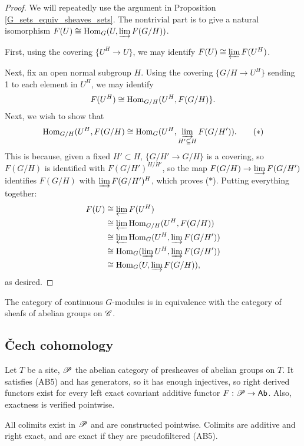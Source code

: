 \documentclass[11pt]{amsart}
\begin{document}
\begin{proof}
We will repeatedly use the argument in Proposition \ref{G_sets_equiv_sheaves_sets}. The nontrivial part is to give a natural isomorphism $F(U)\cong \operatorname{Hom}_G(U, \varinjlim F(G/H))$.

First, using the covering $\{U^H \to U\}$, we may identify $F(U)\cong \varprojlim F(U^H)$.

Next, fix an open normal subgroup $H$. Using the covering $\{G/H\to U^H\}$ sending 1 to each element in $U^H$, we may identify
\[F(U^H) \cong \operatorname{Hom}_{G/H}(U^H, F(G/H)\}.\]
Next, we wish to show that 
\[\operatorname{Hom}_{G/H}(U^H, F(G/H) \cong \operatorname{Hom}_G(U^H, \varinjlim_{H'\subseteq H} F(G/H')). \tag{$\ast$}\] 
This is because, given a fixed $H'\subset H$, $\{G/H'\to G/H\}$ is a covering, so $F(G/H)$ is identified with $F(G/H')^{H/H'}$, so the map $F(G/H) \to \varinjlim F(G/H')$ identifies $F(G/H)$ with $\varinjlim F(G/H')^H$, which proves ($\ast$). Putting everything together:
\begin{align*}
    F(U) &\cong \varprojlim F(U^H) \\
    &\cong \varprojlim \operatorname{Hom}_{G/H}(U^H, F(G/H)) \\
    &\cong \varprojlim \operatorname{Hom}_{G}(U^H, \varinjlim F(G/H')) \\
    &\cong \operatorname{Hom}_G(\varinjlim U^H, \varinjlim F(G/H')) \\
    &\cong \operatorname{Hom}_G(U, \varinjlim F(G/H)),
\end{align*}
as desired.
\end{proof}



\begin{cor}
The category of continuous $G$-modules is in equivalence with the category of sheafs of abelian groups on $\mathscr{C}$.
\end{cor}





\subsection{\v{C}ech cohomology}


Let $T$ be a site, $\mathscr{P}$ the abelian category of presheaves of abelian groups on $T$. It satisfies (AB5) and has generators, so it has enough injectives, so right derived functors exist for every left exact covariant additive functor $F:\mathscr{P}\to \mathsf{Ab}$. Also, exactness is verified pointwise.

\begin{prop}
    All colimits exist in $\mathscr{P}$ and are constructed pointwise. Colimits are additive and right exact, and are exact if they are pseudofiltered (AB5).
\end{prop}
\end{document}

